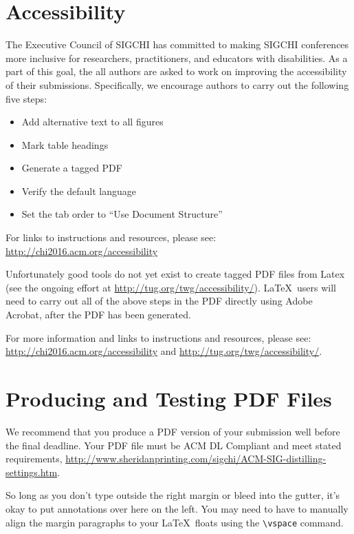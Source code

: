 \documentclass[sigchi-a, authorversion]{acmart}
\begin{document}
\section{Accessibility}
The Executive Council of SIGCHI has committed to making SIGCHI
conferences more inclusive for researchers, practitioners, and
educators with disabilities. As a part of this goal, the all authors
are asked to work on improving the accessibility of their
submissions. Specifically, we encourage authors to carry out the
following five steps:
\begin{itemize}
\item Add alternative text to all figures
\item Mark table headings
\item Generate a tagged PDF
\item Verify the default language
\item Set the tab order to ``Use Document Structure''
\end{itemize}

For links to instructions and resources, please see:
\url{http://chi2016.acm.org/accessibility}

Unfortunately good tools do not yet exist to create tagged PDF files
from Latex (see the ongoing effort at
\url{http://tug.org/twg/accessibility/}). \LaTeX\ users will need to
carry out all of the above steps in the PDF directly using Adobe
Acrobat, after the PDF has been generated.

For more information and links to instructions and resources, please
see:
\url{http://chi2016.acm.org/accessibility} and
\url{http://tug.org/twg/accessibility/}.  


\section{Producing and Testing PDF Files}

We recommend that you produce a PDF version of your submission well
before the final deadline. Your PDF file must be ACM DL Compliant and
meet stated requirements,
\url{http://www.sheridanprinting.com/sigchi/ACM-SIG-distilling-settings.htm}.

\begin{sidebar}
  So long as you don't type outside the right
  margin or bleed into the gutter, it's okay to put annotations over
  here on the left. You may need to have
  to manually align the margin paragraphs to your \LaTeX\ floats using
  the \texttt{{\textbackslash}vspace{}} command.
\end{sidebar}
\end{document}
